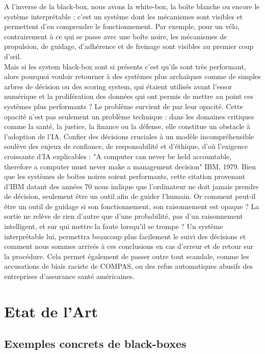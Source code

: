 \documentclass{article}
\begin{document}
A l’inverse de la black-box, nous avons la white-box, la boîte blanche ou encore le système interprétable : c’est un système dont les mécanismes sont visibles et permettent d'en comprendre le fonctionnement. Par exemple, pour un vélo, contrairement à ce qui se passe avec une boîte noire, les mécanismes de propulsion, de guidage, d'adhérence et de freinage sont visibles au premier coup d'œil.\\

Mais si les system black-box sont si présents c’est qu’ils sont très performant, alors pourquoi vouloir retourner à des systèmes plus archaïques comme de simples arbres de décision ou des scoring system, qui étaient utilisés avant l'essor numérique et la prolifération des données qui ont permis de mettre au point ces systèmes plus performants ? Le problème survient de par leur opacité. Cette opacité n’est pas seulement un problème technique : dans les domaines critiques comme la santé, la justice, la finance ou la défense, elle constitue un obstacle à l’adoption de l’IA. Confier des décisions cruciales à un modèle incompréhensible soulève des enjeux de confiance, de responsabilité et d’éthique, d’où l’exigence croissante d’IA explicables : "A computer can never be held accountable, therefore a computer must never make a management decision" IBM, 1979. Bien que les systèmes de boîtes noires soient performants, cette citation provenant d’IBM datant des années 70 nous indique que l’ordinateur ne doit jamais prendre de décision, seulement être un outil afin de guider l’humain. Or comment peut-il être un outil de guidage si son fonctionnement, son raisonnement est opaque ? La sortie ne relève de rien d’autre que d’une probabilité, pas d’un raisonnement intelligent, et sur qui mettre la faute lorsqu’il se trompe ? Un système interprétable lui, permettra beaucoup plus facilement le suivi des décisions et comment nous sommes arrivés à ces conclusions en cas d’erreur et de retour sur la procédure. Cela permet également de passer outre tout scandale, comme les accusations de biais raciste de COMPAS, ou des refus automatiques abusifs des entreprises d’assurance santé américaines.

\clearpage

\section{Etat de l'Art}

\subsection{Exemples concrets de black-boxes}
\end{document}
